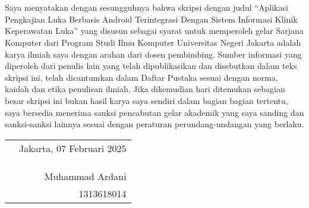 \chapter*{}

Saya menyatakan dengan sesungguhnya bahwa skripsi dengan judul “Aplikasi Pengkajian Luka Berbasis Android Terintegrasi Dengan Sistem Informasi Klinik Keperawatan Luka” yang disusun sebagai syarat untuk memperoleh gelar Sarjana Komputer dari Program Studi Ilmu Komputer Universitas Negeri Jakarta adalah karya ilmiah saya dengan arahan dari dosen pembimbing.
Sumber informasi yang diperoleh dari penulis lain yang telah dipublikasikan dan disebutkan dalam teks skripsi ini, telah dicantumkan dalam Daftar Pustaka sesuai dengan norma, kaidah dan etika penulisan ilmiah.
Jika dikemudian hari ditemukan sebagian besar skripsi ini bukan hasil karya saya sendiri dalam bagian bagian tertentu, saya bersedia menerima sanksi pencabutan gelar akademik yang saya sanding dan sanksi-sanksi lainnya sesuai dengan peraturan perundang-undangan yang berlaku.


\vspace{4cm}

\begin{tabular}{p{}r}
	&Jakarta, 07 Februari 2025\\
	&\\
	&\\
	&\\
	&Muhammad Ardani\\
	&1313618014              
\end{tabular}
